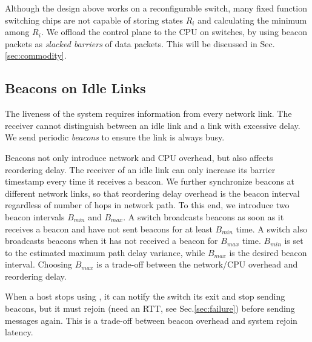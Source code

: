 Although the design above works on a reconfigurable switch, many fixed function switching chips are not capable of storing states $R_i$ and calculating the minimum among $R_i$.
We offload the control plane to the CPU on switches, by using beacon packets as \textit{slacked barriers} of data packets.
This will be discussed in Sec.\ref{sec:commodity}.

\subsection{Beacons on Idle Links}
\label{sec:beacon}

The liveness of the system requires information from every network link.
The receiver cannot distinguish between an idle link and a link with excessive delay.
We send periodic \textit{beacons} to ensure the link is always busy.


Beacons not only introduce network and CPU overhead, but also affects reordering delay.
The receiver of an idle link can only increase its barrier timestamp every time it receives a beacon.
We further synchronize beacons at different network links, so that reordering delay overhead is the beacon interval regardless of number of hops in network path.
To this end, we introduce two beacon intervals $B_{min}$ and $B_{max}$.
A switch broadcasts beacons as soon as it receives a beacon and have not sent beacons for at least $B_{min}$ time.
A switch also broadcasts beacons when it has not received a beacon for $B_{max}$ time.
$B_{min}$ is set to the estimated maximum path delay variance, while $B_{max}$ is the desired beacon interval.
Choosing $B_{max}$ is a trade-off between the network/CPU overhead and reordering delay.

When a host stops using \sys, it can notify the switch its exit and stop sending beacons, but it must rejoin (need an RTT, see Sec.\ref{sec:failure}) before sending messages again.
This is a trade-off between beacon overhead and system rejoin latency.

